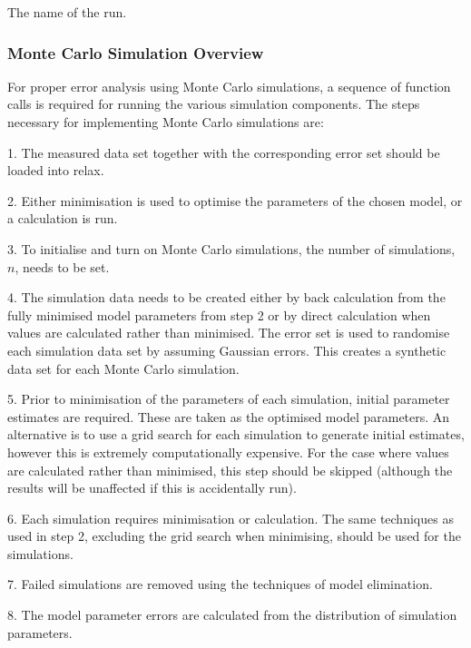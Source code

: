   The name of the run.


\subsubsection{Monte Carlo Simulation Overview}

For proper error analysis using Monte Carlo simulations, a sequence  of function calls is
required for running the various simulation components.  The steps necessary for
implementing Monte Carlo simulations are:

1.  The measured data set together with the corresponding error set should be loaded into
relax.

2.  Either minimisation  is used to optimise  the parameters of the chosen model, or a
calculation is run.

3.  To initialise and turn on Monte Carlo simulations, the number of simulations, $n$, needs
to be set.

4.  The simulation data needs to be created either by back calculation from the fully
minimised  model parameters from step 2 or by direct calculation when values are calculated
rather than minimised.   The error set is used to randomise each simulation data set by
assuming Gaussian errors.  This creates a synthetic data set for each Monte Carlo
simulation.

5.  Prior to minimisation  of the parameters of each simulation, initial parameter estimates
are required.  These are taken as the optimised  model parameters.  An alternative is to use
a grid search for each simulation to generate initial estimates, however this is extremely
computationally expensive.  For the case where values are calculated rather than minimised, 
this step should be skipped (although the results will be unaffected if this is accidentally
run).

6.  Each simulation requires minimisation  or calculation.  The same techniques as used in
step 2, excluding the grid search when minimising, should be used for the simulations.

7.  Failed simulations are removed using the techniques of model elimination.  

8.  The model parameter errors are calculated from the distribution of simulation
parameters.


